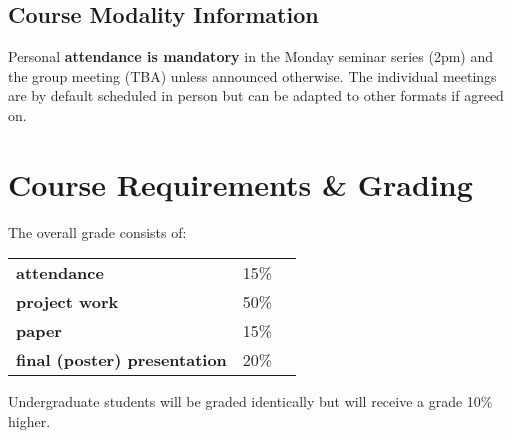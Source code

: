 \documentclass[letterpaper,oneside,10pt]{scrartcl}
\begin{document}
    \subsection{Course Modality Information}
        Personal \textbf{attendance is mandatory} in  the Monday seminar series (2pm) and the group meeting (TBA) unless announced otherwise. The individual meetings are by default scheduled in person but can be adapted to other formats if agreed on.
        
\section{Course Requirements \& Grading}
    The overall grade consists of:
    \smallskip
    
    \begin{tabular}{lll}
        \textbf{attendance} & 15\%\\
        \textbf{project work} & 50\%\\
        \textbf{paper} & 15\%\\
        \textbf{final (poster) presentation} & 20\% \\
    \end{tabular}
    Undergraduate students will be graded identically but will receive a grade 10\% higher.
\end{document}
